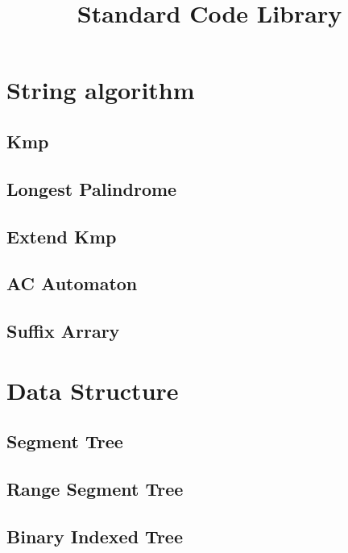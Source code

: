 \documentclass[twoside, UTF8]{article}
\title{Standard Code Library}
\author{}
\newcommand\blankpage{ \null\thispagestyle{empty}\addtocounter{page}{-1}\newpage }
\begin{document}
	\maketitle
	\afterpage{\blankpage}

	\newpage
	\tableofcontents

	\newpage
	\section{String algorithm}
		\subsection{Kmp}
			
		\subsection{Longest Palindrome}
			
		\subsection{Extend Kmp}
			
		\subsection{AC Automaton}
			
		\subsection{Suffix Arrary}
			
	\newpage
	\section{Data Structure}
		\subsection{Segment Tree}
			
		\subsection{Range Segment Tree}
			
		\subsection{Binary Indexed Tree}
			
\end{document}
